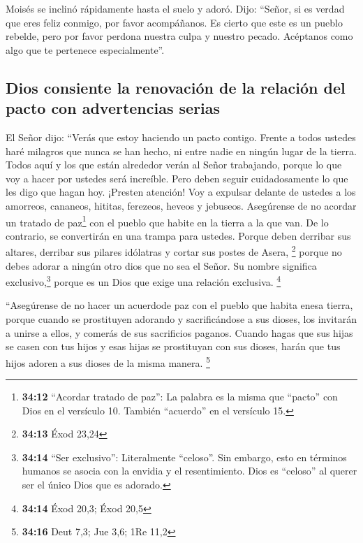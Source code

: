  Moisés se inclinó rápidamente hasta el suelo y adoró.
 Dijo: ``Señor, si es verdad que eres feliz conmigo, por
favor acompáñanos. Es cierto que este es un pueblo rebelde, pero por
favor perdona nuestra culpa y nuestro pecado. Acéptanos como algo que te
pertenece especialmente''.

\hypertarget{dios-consiente-la-renovaciuxf3n-de-la-relaciuxf3n-del-pacto-con-advertencias-serias}{%
\subsection{Dios consiente la renovación de la relación del pacto con
advertencias
serias}\label{dios-consiente-la-renovaciuxf3n-de-la-relaciuxf3n-del-pacto-con-advertencias-serias}}

 El Señor dijo: ``Verás que estoy haciendo un pacto
contigo. Frente a todos ustedes haré milagros que nunca se han hecho, ni
entre nadie en ningún lugar de la tierra. Todos aquí y los que están
alrededor verán al Señor trabajando, porque lo que voy a hacer por
ustedes será increíble.  Pero deben seguir cuidadosamente
lo que les digo que hagan hoy. ¡Presten atención! Voy a expulsar delante
de ustedes a los amorreos, cananeos, hititas, ferezeos, heveos y
jebuseos.  Asegúrense de no acordar un tratado de
paz\footnote{\textbf{34:12} ``Acordar tratado de paz'': La palabra es la
  misma que ``pacto'' con Dios en el versículo 10. También ``acuerdo''
  en el versículo 15.} con el pueblo que habite en la tierra a la que
van. De lo contrario, se convertirán en una trampa para ustedes.
 Porque deben derribar sus altares, derribar sus pilares
idólatras y cortar sus postes de Asera, \footnote{\textbf{34:13} Éxod
  23,24}  porque no debes adorar a ningún otro dios que
no sea el Señor. Su nombre significa exclusivo,\footnote{\textbf{34:14}
  ``Ser exclusivo'': Literalmente ``celoso''. Sin embargo, esto en
  términos humanos se asocia con la envidia y el resentimiento. Dios es
  ``celoso'' al querer ser el único Dios que es adorado.} porque es un
Dios que exige una relación exclusiva. \footnote{\textbf{34:14} Éxod
  20,3; Éxod 20,5}

 ``Asegúrense de no hacer un acuerdode paz con el pueblo
que habita enesa tierra, porque cuando se prostituyen adorando y
sacrificándose a sus dioses, los invitarán a unirse a ellos, y comerás
de sus sacrificios paganos.  Cuando hagas que sus hijas
se casen con tus hijos y esas hijas se prostituyan con sus dioses, harán
que tus hijos adoren a sus dioses de la misma manera. \footnote{\textbf{34:16}
  Deut 7,3; Jue 3,6; 1Re 11,2}

